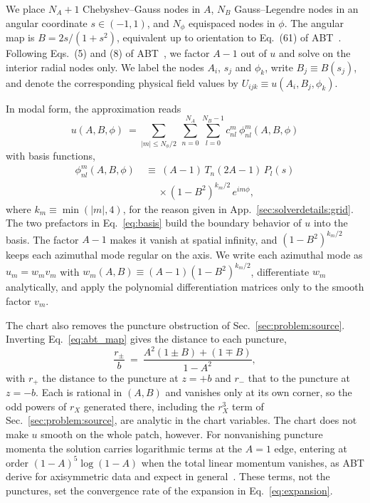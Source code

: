 \documentclass[
  aps,
  prd,
  twocolumn,
  10pt,
  amsmath,
  amssymb,
  nofootinbib,
  superscriptaddress,
  floatfix,
]{revtex4-2}
\begin{document}
We place $N_A{+}1$ Chebyshev--Gauss nodes in $A$, $N_B$ Gauss--Legendre nodes in an angular coordinate $s\in(-1,1)$, and $N_\phi$ equispaced nodes in $\phi$.
The angular map is $B=2s/(1+s^2)$, equivalent up to orientation to Eq.~(61) of ABT~\cite{AnsorgBruegmannTichy2004}.
Following Eqs.~(5) and (8) of ABT~\cite{AnsorgBruegmannTichy2004}, we factor $A-1$ out of $u$ and solve on the interior radial nodes only.
We label the nodes $A_i$, $s_j$ and $\phi_k$, write $B_j\equiv B(s_j)$, and denote the corresponding physical field values by $U_{ijk}\equiv u(A_i,B_j,\phi_k)$.

In modal form, the approximation reads
\begin{equation}
  u(A,B,\phi) \ = \sum_{|m|\le N_\phi/2} \ \sum_{n=0}^{N_A}\sum_{l=0}^{N_B-1} c^{m}_{nl} \ \phi_{nl}^{m}(A,B,\phi) \label{eq:expansion}
\end{equation}
with basis functions,
\begin{equation}
\begin{aligned}
  \phi_{nl}^{m}(A,B,\phi) \ &\equiv \ (A-1)\,T_n(2A-1)\,P_l(s) \\
  &\quad \ \times (1-B^2)^{k_m/2}\,e^{im\phi} ,
\end{aligned}
  \label{eq:basis}
\end{equation}
where $k_m\equiv\min(|m|,4)$, for the reason given in App.~\ref{sec:solverdetails:grid}.
The two prefactors in Eq.~\eqref{eq:basis} build the boundary behavior of $u$ into the basis. The factor $A-1$ makes it vanish at spatial infinity, and $(1-B^2)^{k_m/2}$ keeps each azimuthal mode regular on the axis.
We write each azimuthal mode as $u_m=w_m v_m$ with $w_m(A,B)\equiv(A-1)(1-B^2)^{k_m/2}$, differentiate $w_m$ analytically, and apply the polynomial differentiation matrices only to the smooth factor $v_m$.

The chart also removes the puncture obstruction of Sec.~\ref{sec:problem:source}.
Inverting Eq.~\eqref{eq:abt_map} gives the distance to each puncture,
\begin{equation}
  \frac{r_{\pm}}{b} \ = \ \frac{A^2(1\pm B) + (1\mp B)}{1-A^2},
  \label{eq:puncture_distance}
\end{equation}
with $r_{+}$ the distance to the puncture at $z=+b$ and $r_{-}$ that to the puncture at $z=-b$.
Each is rational in $(A,B)$ and vanishes only at its own corner, so the odd powers of $r_X$ generated there, including the $r_X^3$ term of Sec.~\ref{sec:problem:source}, are analytic in the chart variables.
The chart does not make $u$ smooth on the whole patch, however.
For nonvanishing puncture momenta the solution carries logarithmic terms at the $A=1$ edge, entering at order $(1-A)^5\log(1-A)$ when the total linear momentum vanishes, as ABT derive for axisymmetric data and expect in general~\cite{AnsorgBruegmannTichy2004}.
These terms, not the punctures, set the convergence rate of the expansion in Eq.~\eqref{eq:expansion}.
\end{document}
